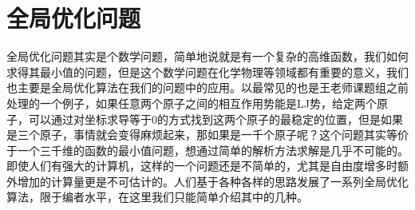 \documentclass{article}
\numberwithin{equation}{section}
\begin{document}
    \section{全局优化问题}
      全局优化问题其实是个数学问题，简单地说就是有一个复杂的高维函数，我们如何求得其最小值的问题，但是这个数学问题在化学物理等领域都有重要的意义，我们也主要是全局优化算法在我们的问题中的应用。以最常见的也是王老师课题组之前处理的一个例子，如果任意两个原子之间的相互作用势能是LJ势，给定两个原子，可以通过对坐标求导等于0的方式找到这两个原子的最稳定的位置，但是如果是三个原子，事情就会变得麻烦起来，那如果是一千个原子呢？这个问题其实等价于一个三千维的函数的最小值问题，想通过简单的解析方法求解是几乎不可能的。即使人们有强大的计算机，这样的一个问题还是不简单的，尤其是自由度增多时额外增加的计算量更是不可估计的。人们基于各种各样的思路发展了一系列全局优化算法，限于编者水平，在这里我们只能简单介绍其中的几种。


  
\end{document}
